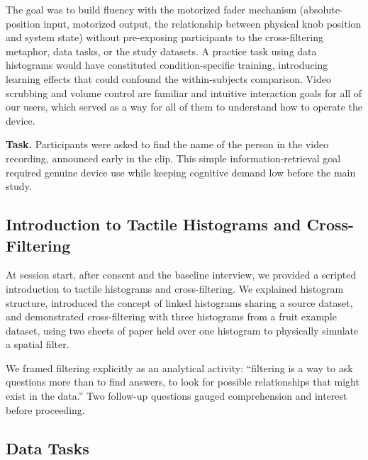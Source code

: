 \documentclass[12pt]{cmuthesis}
\begin{document}
The goal was to build fluency with the motorized fader mechanism (absolute-position input, motorized output, the relationship between physical knob position and system state) without pre-exposing participants to the cross-filtering metaphor, data tasks, or the study datasets. A practice task using data histograms would have constituted condition-specific training, introducing learning effects that could confound the within-subjects comparison. Video scrubbing and volume control are familiar and intuitive interaction goals for all of our users, which served as a way for all of them to understand how to operate the device.


\textbf{Task.}
Participants were asked to find the name of the person in the video recording, announced early in the clip. This simple information-retrieval goal required genuine device use while keeping cognitive demand low before the main study.

 
\subsection{Introduction to Tactile Histograms and Cross-Filtering} 

At session start, after consent and the baseline interview, we provided a scripted introduction to tactile histograms and cross-filtering. We explained histogram structure, introduced the concept of linked histograms sharing a source dataset, and demonstrated cross-filtering with three histograms from a fruit example dataset, using two sheets of paper held over one histogram to physically simulate a spatial filter.

We framed filtering explicitly as an analytical activity: ``filtering is a way to ask questions more than to find answers, to look for possible relationships that might exist in the data.'' Two follow-up questions gauged comprehension and interest before proceeding.

 
\subsection{Data Tasks} 
\end{document}
